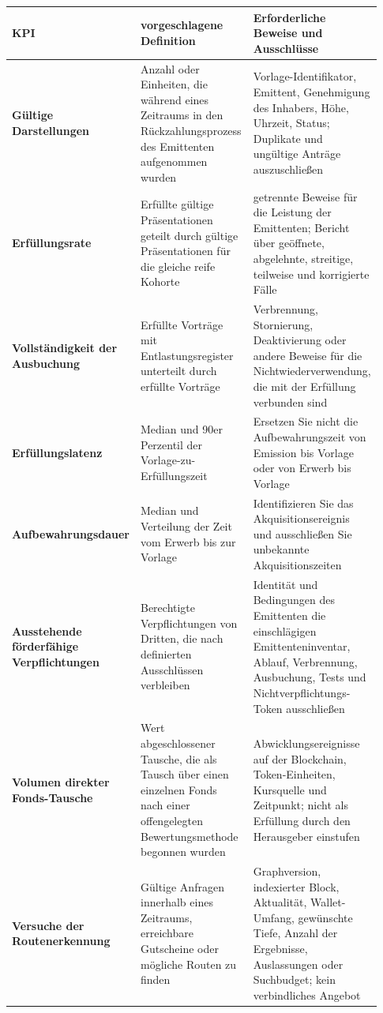 \documentclass[11pt]{article}
\begin{document}
\begin{longtable}{P{0.31\linewidth} P{0.31\linewidth} P{0.31\linewidth}}
\toprule
KPI & vorgeschlagene Definition & Erforderliche Beweise und Ausschlüsse \\
\midrule
\endhead
\textbf{Gültige Darstellungen} & Anzahl oder Einheiten, die während eines Zeitraums in den Rückzahlungsprozess des Emittenten aufgenommen wurden & Vorlage-Identifikator, Emittent, Genehmigung des Inhabers, Höhe, Uhrzeit, Status; Duplikate und ungültige Anträge auszuschließen \\
\textbf{Erfüllungsrate} & Erfüllte gültige Präsentationen geteilt durch gültige Präsentationen für die gleiche reife Kohorte & getrennte Beweise für die Leistung der Emittenten; Bericht über geöffnete, abgelehnte, streitige, teilweise und korrigierte Fälle \\
\textbf{Vollständigkeit der Ausbuchung} & Erfüllte Vorträge mit Entlastungsregister unterteilt durch erfüllte Vorträge & Verbrennung, Stornierung, Deaktivierung oder andere Beweise für die Nichtwiederverwendung, die mit der Erfüllung verbunden sind \\
\textbf{Erfüllungslatenz} & Median und 90er Perzentil der Vorlage-zu-Erfüllungszeit & Ersetzen Sie nicht die Aufbewahrungszeit von Emission bis Vorlage oder von Erwerb bis Vorlage \\
\textbf{Aufbewahrungsdauer} & Median und Verteilung der Zeit vom Erwerb bis zur Vorlage & Identifizieren Sie das Akquisitionsereignis und ausschließen Sie unbekannte Akquisitionszeiten \\
\textbf{Ausstehende förderfähige Verpflichtungen} & Berechtigte Verpflichtungen von Dritten, die nach definierten Ausschlüssen verbleiben & Identität und Bedingungen des Emittenten die einschlägigen Emittenteninventar, Ablauf, Verbrennung, Ausbuchung, Tests und Nichtverpflichtungs-Token ausschließen \\
\textbf{Volumen direkter Fonds-Tausche} & Wert abgeschlossener Tausche, die als Tausch über einen einzelnen Fonds nach einer offengelegten Bewertungsmethode begonnen wurden & Abwicklungsereignisse auf der Blockchain, Token-Einheiten, Kursquelle und Zeitpunkt; nicht als Erfüllung durch den Herausgeber einstufen \\
\textbf{Versuche der Routenerkennung} & Gültige Anfragen innerhalb eines Zeitraums, erreichbare Gutscheine oder mögliche Routen zu finden & Graphversion, indexierter Block, Aktualität, Wallet-Umfang, gewünschte Tiefe, Anzahl der Ergebnisse, Auslassungen oder Suchbudget; kein verbindliches Angebot \\

\end{longtable}
\end{document}
